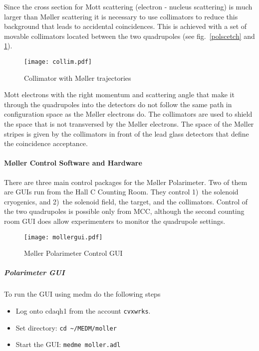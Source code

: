 {Since the cross section for Mott scattering (electron - nucleus
scattering) is much larger than M\o ller scattering it is necessary
to use collimators to reduce this background that leads to accidental
coincidences. This is achieved with a set of movable collimators
located between the two quadrupoles (see fig.~\ref{polscetch} 
and \ref{colscetch}). 
%
\begin{figure}
\texttt{[image: collim.pdf]}
\begin{center}
\caption{Collimator with M\o ller trajectories\label{colscetch}}
\end{center}
\end{figure}
Mott electrons with the right momentum and scattering angle that make it
through the quadrupoles into the detectors do not follow the same
path in configuration space as 
the M\o ller electrons do.  The collimators are used to shield the
space that is not transversed by the M\o ller electrons. The space of
the M\o ller stripes is  
given by the collimators in front of the lead glass detectors
that define the coincidence acceptance.
%

\paragraph{M\o ller Control Software and Hardware}
There are three main control packages for the M\o ller Polarimeter.
Two of them are GUIs run from the Hall C Counting Room. They
control 1)~the solenoid cryogenics, and 2)~the solenoid field, 
the target, and the collimators. Control of the two quadrupoles
is possible only from MCC, although the second counting room GUI does
allow experimenters to monitor the quadrupole settings.


\begin{figure}
  \begin{center}
  \texttt{[image: mollergui.pdf]}
  \caption{M\o ller Polarimeter Control GUI\label{molpolmedm}}
  \end{center}
\end{figure}
%

\subparagraph{Polarimeter GUI}

To run the GUI using medm do the following steps
\begin{itemize}
\item Log onto cdaqh1 from the account \texttt{cvxwrks}.
\item Set directory: \texttt{cd \textasciitilde{}/MEDM/moller}
\item Start the GUI: \texttt{medme moller.adl}
\end{itemize}
%

}
